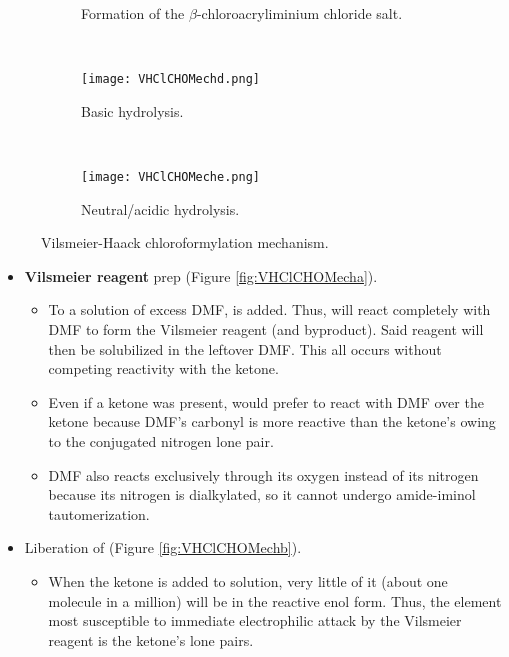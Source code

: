 \documentclass[../notes.tex]{subfiles}
\begin{document}
\begin{itemize}
\begin{figure}[h!]
\begin{subfigure}[b]{\linewidth}
            \caption{Formation of the $\beta$-chloroacryliminium chloride salt.}
            \label{fig:VHClCHOMechc}
        \end{subfigure}\\[2em]
        \begin{subfigure}[b]{\linewidth}
            \centering
            \texttt{[image: VHClCHOMechd.png]}
            \caption{Basic hydrolysis.}
            \label{fig:VHClCHOMechd}
        \end{subfigure}\\[2em]
        \begin{subfigure}[b]{\linewidth}
            \centering
            \texttt{[image: VHClCHOMeche.png]}
            \caption{Neutral/acidic hydrolysis.}
            \label{fig:VHClCHOMeche}
        \end{subfigure}
        \caption{Vilsmeier-Haack chloroformylation mechanism.}
        \label{fig:VHClCHOMech}
    \end{figure}
    \begin{itemize}
        \item \textbf{Vilsmeier reagent} prep (Figure \ref{fig:VHClCHOMecha}).
        \begin{itemize}
            \item To a solution of excess DMF,  is added. Thus,  will react completely with DMF to form the Vilsmeier reagent (and  byproduct). Said reagent will then be solubilized in the leftover DMF. This all occurs without competing reactivity with the ketone.
            \item Even if a ketone was present,  would prefer to react with DMF over the ketone because DMF's carbonyl is more reactive than the ketone's owing to the conjugated nitrogen lone pair.
            \item DMF also reacts exclusively through its oxygen instead of its nitrogen because its nitrogen is dialkylated, so it cannot undergo amide-iminol tautomerization.
        \end{itemize}
        \item Liberation of  (Figure \ref{fig:VHClCHOMechb}).
        \begin{itemize}
            \item When the ketone is added to solution, very little of it (about one molecule in a million) will be in the reactive enol form. Thus, the element most susceptible to immediate electrophilic attack by the Vilsmeier reagent is the ketone's lone pairs.

\end{itemize}
\end{itemize}
\end{itemize}
\end{document}
